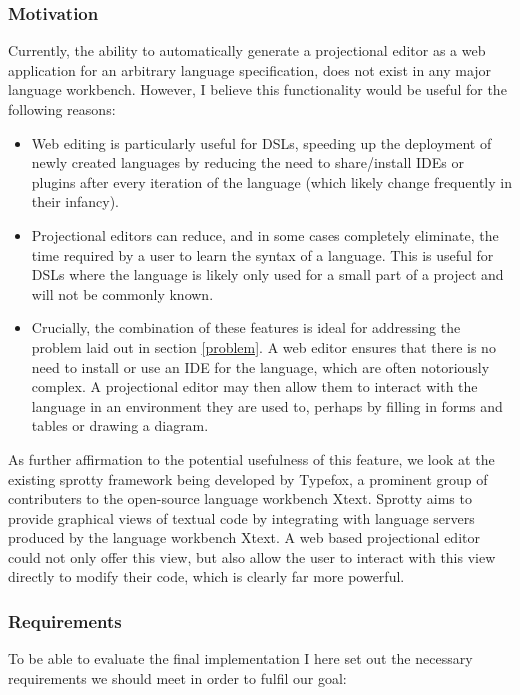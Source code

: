 \documentclass{report}
\begin{document}
\subsubsection{Motivation}
Currently, the ability to automatically generate a projectional editor as a web application for an arbitrary language specification, does not exist in any major language workbench. However, I believe this functionality would be useful for the following reasons:
\begin{itemize}
\item Web editing is particularly useful for DSLs, speeding up the deployment of newly created languages by reducing the need to share/install IDEs or plugins after every iteration of the language (which likely change frequently in their infancy). 
\item Projectional editors can reduce, and in some cases completely eliminate, the time required by a user to learn the syntax of a language. This is useful for DSLs where the language is likely only used for a small part of a project and will not be commonly known.
\item Crucially, the combination of these features is ideal for addressing the problem laid out in section \ref{problem}. A web editor ensures that there is no need to install or use an IDE for the language, which are often notoriously complex. A projectional editor may then allow them to interact with the language in an environment they are used to, perhaps by filling in forms and tables or drawing a diagram.  
\end{itemize} 
As further affirmation to the potential usefulness of this feature, we look at the existing sprotty framework being developed by Typefox\cite{sprotty}, a prominent group of contributers to the open-source language workbench Xtext. Sprotty aims to provide graphical views of textual code by integrating with language servers produced by the language workbench Xtext. A web based projectional editor could not only offer this view, but also allow the user to interact with this view directly to modify their code, which is clearly far more powerful. 

\subsubsection{Requirements}\label{requirements}
To be able to evaluate the final implementation I here set out the necessary requirements we should meet in order to fulfil our goal: 
\end{document}
